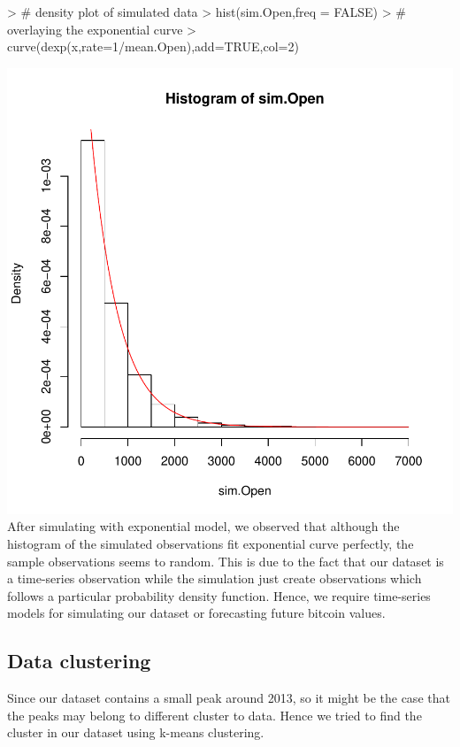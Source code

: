 \documentclass{article}
\begin{document}
\begin{Schunk}
\begin{Sinput}
> # density plot of simulated data
> hist(sim.Open,freq = FALSE) 
> # overlaying the exponential curve
> curve(dexp(x,rate=1/mean.Open),add=TRUE,col=2)    
\end{Sinput}
\end{Schunk}
\includegraphics{Report-008}
After simulating with exponential model, we observed that although the histogram of the simulated observations fit exponential curve perfectly, the sample observations seems to random. This is due to the fact that our dataset is a time-series observation while the simulation just create observations which follows a particular probability density function. Hence, we require time-series models for simulating our dataset or forecasting future bitcoin values.

\subsection{Data clustering}
Since our dataset contains a small peak around 2013, so it might be the case that the peaks may belong to different cluster to data. Hence we tried to find the cluster in our dataset using k-means clustering.
\end{document}
